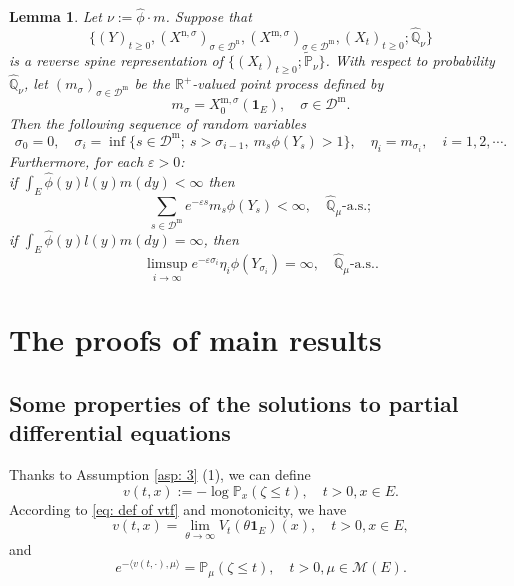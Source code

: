 \documentclass[12pt,a4paper]{amsart}
\theoremstyle{plain}
\newtheorem{lem}[thm]{Lemma}
\theoremstyle{definition}
\numberwithin{equation}{section}
\begin{document}
\begin{lem}\label{import lemma}
	Let $\nu := \widehat \phi \cdot m$.
	Suppose that \[\{(Y)_{t\geq 0}, (X^{\mathrm n, \sigma})_{\sigma\in \mathcal D^\mathrm n}, (X^{\mathrm m, \sigma})_{\sigma \in \mathcal D^\mathrm m}, (X_t)_{t\geq 0}; \widehat{\mathbb Q}_{\nu}\}\] is a reverse spine representation of $\{(X_t)_{t\geq 0}; \widetilde {\mathbb P}_\nu\}$.
	With respect to probability $\widehat{\mathbb Q}_\nu$, let $(m_\sigma)_{\sigma\in \mathcal D^{\mathrm m}}$ be the $\mathbb R^+$-valued point process defined by
\[
	m_\sigma
	= X^{\mathrm m, \sigma}_0(\mathbf 1_E),
	\quad \sigma \in \mathcal D^{\mathrm m}.
\]
	Then the following sequence of random variables
\[
	\sigma_0=0,\quad \sigma_i=\inf\{s\in\mathcal D^{\mathrm m};\ s>\sigma_{i-1},\ m_s\phi(Y_s)>1\}, \quad\eta_i=m_{\sigma_i},\quad i=1,2,\cdots.
\]
	Furthermore, for each $\varepsilon>0$:
	\\if $\int_E\hat{\phi}(y)l(y)m(dy)<\infty$ then
\[
	\sum_{s\in\mathcal D^{\mathrm m}} e^{-\varepsilon s}m_s\phi(Y_s)
	< \infty,
	\quad \widehat{\mathbb Q}_{\mu}\text{-a.s.};
\]
	if $ \int_E\hat{\phi}(y)l(y)m(dy)=\infty$, then
\[
	\limsup_{i\rightarrow\infty} e^{-\varepsilon\sigma_i}\eta_i \phi(Y_{\sigma_i})
	=\infty,
	\quad \widehat{\mathbb Q}_{\mu}\text{-a.s.}.
\]
\end{lem}

\section{The proofs of main results}
\subsection{Some properties of the solutions to partial differential equations}
	Thanks to Assumption \ref{asp: 3} (1), we can define
\[
	v(t,x):= -\log \mathbb P_x(\zeta \leq t),
\quad t > 0, x\in E.
\]
	According to \eqref{eq: def of vtf} and monotonicity, we have
\[
	v(t,x)
	= \lim_{\theta \to \infty} V_t(\theta \mathbf 1_E)(x),
	\quad t>0, x\in E,
\]
	and
\begin{equation}
\label{eq: v and extinction}
	e^{-\langle v(t,\cdot), \mu \rangle}
	= \mathbb P_\mu(\zeta \leq t),
\quad t>0, \mu \in \mathcal M(E).
\end{equation}
\end{document}
